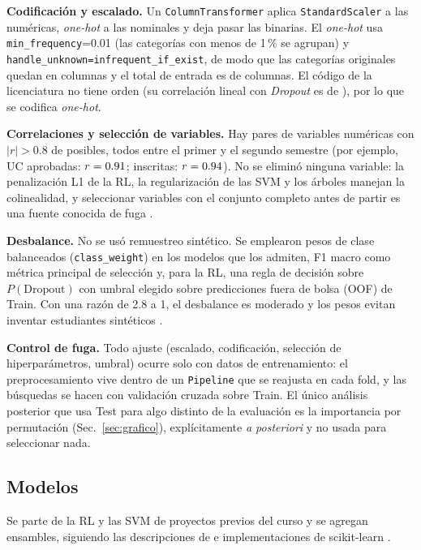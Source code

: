 \documentclass[conference]{IEEEtran}
\newcommand{\cD}{\emph{Dropout}}
\newcommand{\Fm}{F1 macro}
\begin{document}
\textbf{Codificación y escalado.} Un \texttt{ColumnTransformer} aplica \texttt{StandardScaler} a las \nNum{} numéricas, \emph{one-hot} a las \nNom{} nominales y deja pasar las \nBin{} binarias. El \emph{one-hot} usa \texttt{min\_frequency}=0.01 (las categorías con menos de 1\,\% se agrupan) y \texttt{handle\_unknown=infrequent\_if\_exist}, de modo que las \nCatOrig{} categorías originales quedan en \nOH{} columnas y el total de entrada es de \nCols{} columnas. El código de la licenciatura no tiene orden (su correlación lineal con \cD{} es de \rCurso{}), por lo que se codifica \emph{one-hot}.

\textbf{Correlaciones y selección de variables.} Hay \nCorrAlta{} pares de variables numéricas con $|r|>0.8$ de \nParesNum{} posibles, todos entre el primer y el segundo semestre (por ejemplo, UC aprobadas: $r=0.91$; inscritas: $r=0.94$). No se eliminó ninguna variable: la penalización L1 de la RL, la regularización de las SVM y los árboles manejan la colinealidad, y seleccionar variables con el conjunto completo antes de partir es una fuente conocida de fuga \cite{kapoor2023}.

\textbf{Desbalance.} No se usó remuestreo sintético. Se emplearon pesos de clase balanceados (\texttt{class\_weight}) en los modelos que los admiten, \Fm{} como métrica principal de selección y, para la RL, una regla de decisión sobre $P(\mathrm{Dropout})$ con umbral elegido sobre predicciones fuera de bolsa (OOF) de Train. Con una razón de 2.8 a 1, el desbalance es moderado y los pesos evitan inventar estudiantes sintéticos \cite{chawla2002}.

\textbf{Control de fuga.} Todo ajuste (escalado, codificación, selección de hiperparámetros, umbral) ocurre solo con datos de entrenamiento: el preprocesamiento vive dentro de un \texttt{Pipeline} que se reajusta en cada fold, y las búsquedas se hacen con validación cruzada sobre Train. El único análisis posterior que usa Test para algo distinto de la evaluación es la importancia por permutación (Sec.~\ref{sec:grafico}), explícitamente \emph{a posteriori} y no usada para seleccionar nada.

\subsection{Modelos}
Se parte de la RL y las SVM de proyectos previos del curso y se agregan ensambles, siguiendo las descripciones de \cite{geron2019} e implementaciones de scikit-learn \cite{pedregosa2011}.
\end{document}
